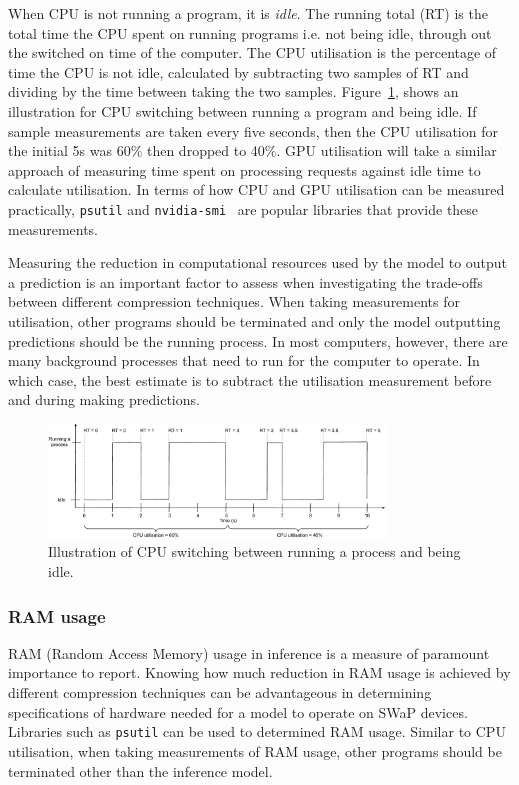 When CPU is not running a program, it is \textit{idle}. The running total (RT) is the total time the CPU spent on running programs i.e. not being idle, through out the switched on time of the computer. 
%
The CPU utilisation is the percentage of time the CPU is not idle, calculated by subtracting two samples of RT and dividing by the time between taking the two samples.
%
Figure~\ref{fig:cpu_utilisation_illustration}, shows an illustration for CPU switching between running a program and being idle. If sample measurements are taken every five seconds, then the CPU utilisation for the initial 5s was 60\% then dropped to 40\%. 
%
GPU utilisation will take  a similar approach of measuring time spent on processing requests against idle time to calculate utilisation. 
%
In terms of how CPU and GPU utilisation can be measured practically, \texttt{psutil} \cite{psutil2019} and \texttt{nvidia-smi}~\cite{NVIDIA_SMI} are popular libraries that provide these measurements.

Measuring the reduction in computational resources used by the model to output a prediction is an important factor to assess when investigating the trade-offs between different compression techniques.
%
When taking measurements for utilisation, other programs should be terminated and only the model outputting predictions should be the running process. In most computers, however, there are many background processes that need to run for the computer to operate. 
%
In which case, the best estimate is to subtract the utilisation measurement before and during making predictions.

\begin{figure}[h]
    \centering
    \includegraphics[width=0.8\textwidth]{other/figures/CPU_utilisation_diagram_v1.pdf}
    \caption{Illustration of CPU switching between running a process and being idle.}
    \label{fig:cpu_utilisation_illustration}
\end{figure}

\subsubsection{RAM usage}
RAM (Random Access Memory) usage in inference is a measure of paramount importance to report. 
%
Knowing how much reduction in RAM usage is achieved by different compression techniques can be advantageous in determining specifications of hardware needed for a model to operate on SWaP devices.
%
Libraries such as \texttt{psutil} \cite{psutil2019} can be used to determined RAM usage.
%
Similar to CPU utilisation, when taking measurements of RAM usage, other programs should be terminated other than the inference model. 
%

